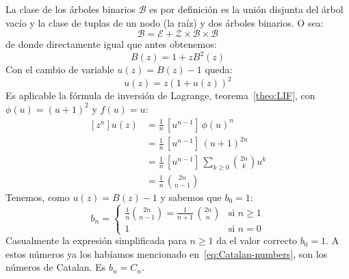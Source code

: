   La clase de los árboles binarios \(\mathcal{B}\)
  es por definición es la unión disjunta del árbol vacío
  y la clase de tuplas de un nodo (la raíz)
  y dos árboles binarios.%
  O sea:
  \begin{equation*}
    \mathcal{B}
      = \mathcal{E}
	  + \mathcal{Z} \times \mathcal{B} \times \mathcal{B}
  \end{equation*}
  de donde directamente
  igual que antes obtenemos:
  \begin{equation*}
    B(z)
      = 1 + z B^2(z)
  \end{equation*}
  Con el cambio de variable \(u(z) = B(z) - 1\) queda:
  \begin{equation*}
    u(z)
      = z (1 + u(z))^2
  \end{equation*}
  Es aplicable la fórmula de inversión de Lagrange,%
  teorema~\ref{theo:LIF},
  con \(\phi(u) = (u + 1)^2\) y \(f(u) = u\):
  \begin{align*}
    \left[ z^n \right] u(z)
      &= \frac{1}{n} \, \left[ u^{n - 1} \right] \, \phi(u)^n \\
      &= \frac{1}{n} \, \left[ u^{n - 1} \right] \, (u + 1)^{2 n} \\
      &= \frac{1}{n} \, \left[ u^{n - 1} \right] \,
	   \sum_{k \ge 0} \binom{2 n}{k} u^k \\
      &= \frac{1}{n} \, \binom{2 n}{n - 1}
  \end{align*}
  Tenemos,
  como \(u(z) = B(z) - 1\) y sabemos que \(b_0 = 1\):
  \begin{equation*}
    b_n =
    \begin{cases}
      \displaystyle
	\frac{1}{n}\binom{2 n}{n - 1}
	  = \frac{1}{n + 1} \, \binom{2 n}{n}
	       & \text{si \(n \ge 1\)} \\
      1
	       & \text{si \(n = 0\)}
    \end{cases}
  \end{equation*}
  Casualmente la expresión simplificada para \(n \ge 1\)
  da el valor correcto \(b_0 = 1\).
  A estos números ya los habíamos mencionado
  en~\eqref{eq:Catalan-numbers},%
  son los números de Catalan.
  Es \(b_n = C_n\).

